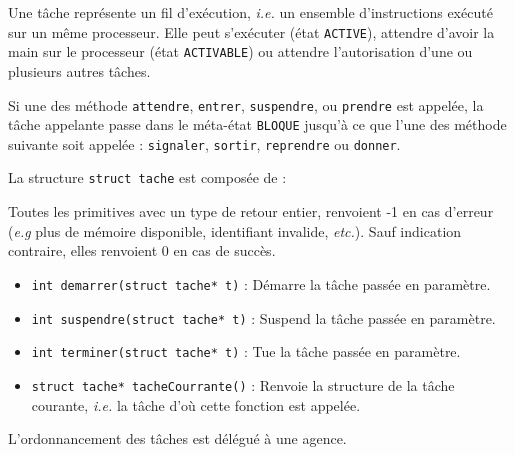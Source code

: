 {
Une tâche représente un fil d'exécution, \textsl{i.e.} un ensemble d'instructions exécuté sur un même processeur. Elle peut s'exécuter (état \lstinline{ACTIVE}), attendre d'avoir la main sur le processeur (état \lstinline{ACTIVABLE}) ou attendre l'autorisation d'une ou plusieurs autres tâches. 

Si une des méthode \lstinline{attendre}, \lstinline{entrer}, \lstinline{suspendre}, ou \lstinline{prendre} est appelée, la tâche appelante passe dans le méta-état \lstinline{BLOQUE} jusqu'à ce que l'une des méthode suivante soit appelée : \lstinline{signaler}, \lstinline{sortir}, \lstinline{reprendre} ou \lstinline{donner}.
}
{
La structure \lstinline{struct tache} est composée de :
}
{
Toutes les primitives avec un type de retour entier, renvoient -1 en cas d'erreur (\textsl{e.g} plus de mémoire disponible, identifiant invalide, \textsl{etc.}). Sauf indication contraire, elles renvoient 0 en cas de succès.

\begin{itemize}
	\item \lstinline{int demarrer(struct tache* t)} : Démarre la tâche passée en paramètre.
	\item \lstinline{int suspendre(struct tache* t)} : Suspend la tâche passée en paramètre. 
	\item \lstinline{int terminer(struct tache* t)} : Tue la tâche passée en paramètre.
	\item \lstinline{struct tache* tacheCourrante()} : Renvoie la structure de la tâche courante, \textsl{i.e.} la tâche d'où cette fonction est appelée.
\end{itemize}
}
{}
{L'ordonnancement des tâches est délégué à une agence.}

